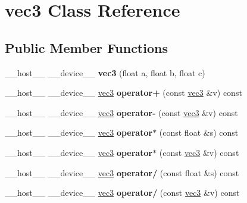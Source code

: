 \hypertarget{classvec3}{}\section{vec3 Class Reference}
\label{classvec3}
\subsection*{Public Member Functions}
\begin{DoxyCompactItemize}
\item 
\mbox{\label{classvec3_a4acbd353a5e121d018048b5f7391e841}} 
\+\_\+\+\_\+host\+\_\+\+\_\+ \+\_\+\+\_\+device\+\_\+\+\_\+ {\bfseries vec3} (float a, float b, float c)
\item 
\mbox{\label{classvec3_a4dc60158c63781877fb71ebff7c00303}} 
\+\_\+\+\_\+host\+\_\+\+\_\+ \+\_\+\+\_\+device\+\_\+\+\_\+ \hyperlink{classvec3}{vec3} {\bfseries operator+} (const \hyperlink{classvec3}{vec3} \&v) const
\item 
\mbox{\label{classvec3_ad283381c62ed9f6b78b50bf7a52c4516}} 
\+\_\+\+\_\+host\+\_\+\+\_\+ \+\_\+\+\_\+device\+\_\+\+\_\+ \hyperlink{classvec3}{vec3} {\bfseries operator-\/} (const \hyperlink{classvec3}{vec3} \&v) const
\item 
\mbox{\label{classvec3_ae7e6adfaa2700354c81247bcd7e24841}} 
\+\_\+\+\_\+host\+\_\+\+\_\+ \+\_\+\+\_\+device\+\_\+\+\_\+ \hyperlink{classvec3}{vec3} {\bfseries operator$\ast$} (const float \&s) const
\item 
\mbox{\label{classvec3_ad700a89b0950d55f14edb06e828bcd58}} 
\+\_\+\+\_\+host\+\_\+\+\_\+ \+\_\+\+\_\+device\+\_\+\+\_\+ \hyperlink{classvec3}{vec3} {\bfseries operator$\ast$} (const \hyperlink{classvec3}{vec3} \&v) const
\item 
\mbox{\label{classvec3_a8d988c6e85fcb6490c62c9dddcc089d6}} 
\+\_\+\+\_\+host\+\_\+\+\_\+ \+\_\+\+\_\+device\+\_\+\+\_\+ \hyperlink{classvec3}{vec3} {\bfseries operator/} (const float \&s) const
\item 
\mbox{\label{classvec3_a4d1a7c3c089c142283f8bba5b624188c}} 
\+\_\+\+\_\+host\+\_\+\+\_\+ \+\_\+\+\_\+device\+\_\+\+\_\+ \hyperlink{classvec3}{vec3} {\bfseries operator/} (const \hyperlink{classvec3}{vec3} \&v) const

\end{DoxyCompactItemize}
